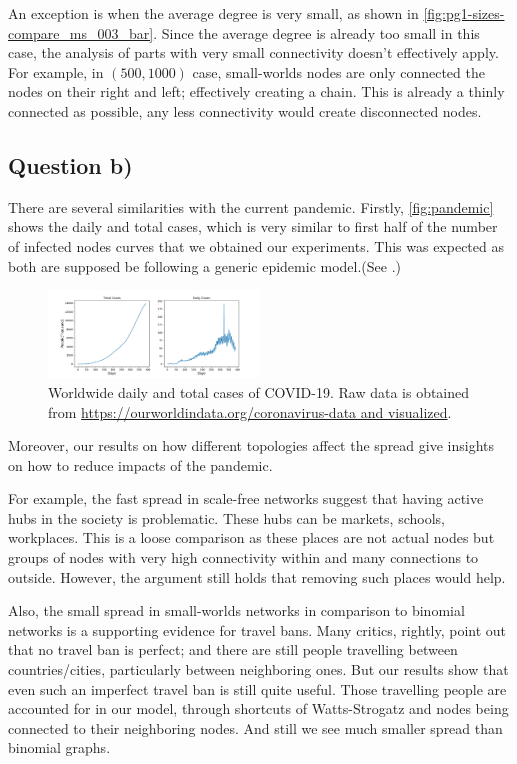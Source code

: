 \documentclass[conference]{IEEEtran}
\begin{document}
An exception is when the average degree is very small, as shown in \autoref{fig:pg1-sizes-compare_ms_003_bar}. Since the average degree is already too small in this case, the analysis of parts with very small connectivity doesn't effectively apply. For example, in $(500,1000)$ case, small-worlds nodes are only connected the nodes on their right and left; effectively creating a chain. This is already a thinly connected as possible, any less connectivity would create disconnected nodes.


\subsection{Question b)}

There are several similarities with the current pandemic. Firstly, \autoref{fig:pandemic} shows the daily and total cases, which is very similar to first half of the number of infected nodes curves that we obtained our experiments. This was expected as both are supposed be following a generic epidemic model.(See \cite{redcode}.)

\begin{figure}[htb]
  \begin{center}
	\includegraphics[width=0.5\textwidth]{img/pandemic.pdf}
  \end{center}
	\caption{Worldwide daily and total cases of COVID-19. Raw data is obtained from \url{https://ourworldindata.org/coronavirus-data and visualized}.}
	\label{fig:pandemic}
\end{figure}

Moreover, our results on how different topologies affect the spread give insights on how to reduce impacts of the pandemic.

For example, the fast spread in scale-free networks suggest that having active hubs in the society is problematic. These hubs can be markets, schools, workplaces. This is a loose comparison as these places are not actual nodes but groups of nodes with very high connectivity within and many connections to outside. However, the argument still holds that removing such places would help.

Also, the small spread in small-worlds networks in comparison to binomial networks is a supporting evidence for travel bans. Many critics, rightly, point out that no travel ban is perfect; and there are still people travelling between countries/cities, particularly between neighboring ones. But our results show that even such an imperfect travel ban is still quite useful. Those travelling people are accounted for in our model, through shortcuts of Watts-Strogatz and nodes being connected to their neighboring nodes. And still we see much smaller spread than binomial graphs.
\end{document}
